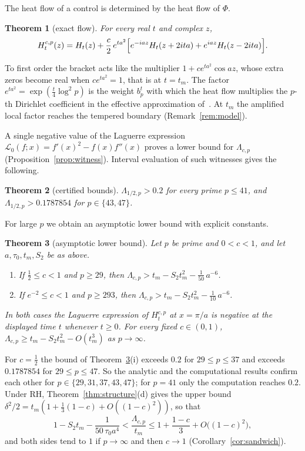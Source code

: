 \documentclass[11pt]{article}
\numberwithin{equation}{section}
\newtheorem{theorem}{Theorem}[section]
\theoremstyle{definition}
\theoremstyle{remark}
\newcommand{\Lag}{\mathscr L_0}
\begin{document}
The heat flow of a control is determined by the heat flow of $\Phi$.

\begin{theorem}[exact flow]\label{thm:flow}
For every real $t$ and complex $z$,
\[
H^{c,p}_t(z)=H_t(z)+\frac c2\,e^{ta^2}\Bigl[e^{-iaz}H_t(z+2ita)
+e^{iaz}H_t(z-2ita)\Bigr].
\]
\end{theorem}

To first order the bracket acts like the multiplier
$1+ce^{ta^2}\cos az$, whose extra zeros become real when
$ce^{ta^2}=1$, that is at $t=t_m$. The factor
$e^{ta^2}=\exp(\tfrac t4\log^2p)$ is the weight $b_p^t$ with which the heat
flow multiplies the $p$-th Dirichlet coefficient in the effective
approximation of~\cite{polymath}. At $t_m$ the amplified local factor
reaches the tempered boundary (Remark~\ref{rem:model}).

A single negative value of the Laguerre expression
$\Lag(f;x)=f'(x)^2-f(x)f''(x)$ proves a lower bound for
$\Lambda_{c,p}$ (Proposition~\ref{prop:witness}). Interval evaluation of
such witnesses gives the following.

\begin{theorem}[certified bounds]\label{thm:certified}
$\Lambda_{1/2,p}>0.2$ for every prime $p\le41$, and
$\Lambda_{1/2,p}>0.1787854$ for $p\in\{43,47\}$.
\end{theorem}

For large $p$ we obtain an asymptotic lower bound with explicit
constants.

\begin{theorem}[asymptotic lower bound]\label{thm:asymptotic}
Let $p$ be prime and $0<c<1$, and let $a,\tau_0,t_m,S_2$ be as above.
\begin{enumerate}[label=\textup{(\roman*)}]
\item If $\tfrac12\le c<1$ and $p\ge29$, then
$\Lambda_{c,p}>t_m-S_2t_m^2-\tfrac1{50}\,a^{-6}$.
\item If $e^{-2}\le c<1$ and $p\ge293$, then
$\Lambda_{c,p}>t_m-S_2t_m^2-\tfrac1{10}\,a^{-6}$.
\end{enumerate}
In both cases the Laguerre expression of $H^{c,p}_t$ at $x=\pi/a$ is negative
at the displayed time $t$ whenever $t\ge0$. For every fixed $c\in(0,1)$,
$\Lambda_{c,p}\ge t_m-S_2t_m^2-O(t_m^3)$ as $p\to\infty$.
\end{theorem}

For $c=\tfrac12$ the bound of Theorem~\ref{thm:asymptotic}(i) exceeds
$0.2$ for $29\le p\le37$ and exceeds $0.1787854$ for $29\le p\le47$. So the
analytic and the computational results confirm each other for
$p\in\{29,31,37,43,47\}$; for $p=41$ only the computation reaches $0.2$. Under RH, Theorem~\ref{thm:structure}(d) gives
the upper bound $\delta^2/2=t_m(1+\tfrac13(1-c)+O((1-c)^2))$, so that
\[
1-S_2t_m-\frac{1}{50\,\tau_0a^4}<\frac{\Lambda_{c,p}}{t_m}
\le1+\frac{1-c}3+O\bigl((1-c)^2\bigr),
\]
and both sides tend to $1$ if $p\to\infty$ and then $c\to1$
(Corollary~\ref{cor:sandwich}).
\end{document}
